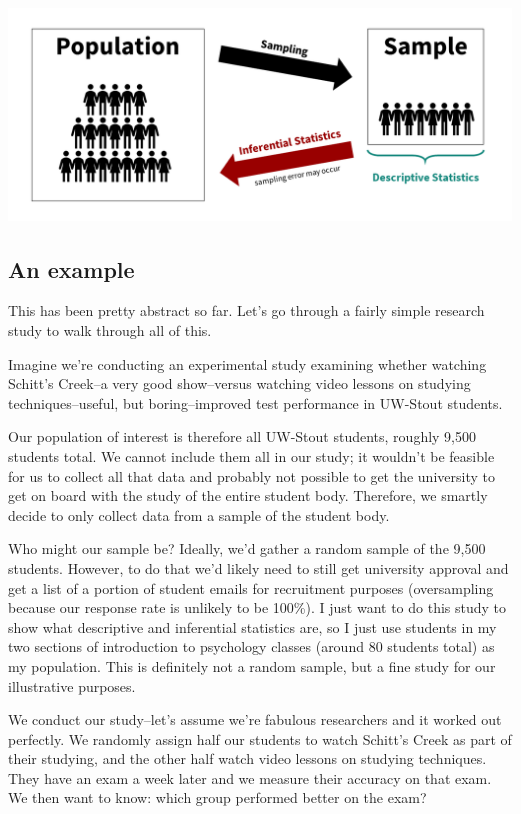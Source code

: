 \documentclass[
]{book}
\begin{document}
\includegraphics{images/02-stats-foundations/descriptive-vs-inferential.png}

\hypertarget{an-example}{%
\subsection{An example}\label{an-example}}

This has been pretty abstract so far. Let's go through a fairly simple research study to walk through all of this.

Imagine we're conducting an experimental study examining whether watching Schitt's Creek--a very good show--versus watching video lessons on studying techniques--useful, but boring--improved test performance in UW-Stout students.

Our population of interest is therefore all UW-Stout students, roughly 9,500 students total. We cannot include them all in our study; it wouldn't be feasible for us to collect all that data and probably not possible to get the university to get on board with the study of the entire student body. Therefore, we smartly decide to only collect data from a sample of the student body.

Who might our sample be? Ideally, we'd gather a random sample of the 9,500 students. However, to do that we'd likely need to still get university approval and get a list of a portion of student emails for recruitment purposes (oversampling because our response rate is unlikely to be 100\%). I just want to do this study to show what descriptive and inferential statistics are, so I just use students in my two sections of introduction to psychology classes (around 80 students total) as my population. This is definitely not a random sample, but a fine study for our illustrative purposes.

We conduct our study--let's assume we're fabulous researchers and it worked out perfectly. We randomly assign half our students to watch Schitt's Creek as part of their studying, and the other half watch video lessons on studying techniques. They have an exam a week later and we measure their accuracy on that exam. We then want to know: which group performed better on the exam?
\end{document}
